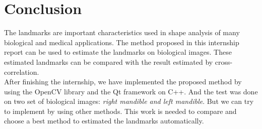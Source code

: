 \chapter*{Conclusion}
\indent The landmarks are important characteristics used in shape analysis of many biological and medical applications. The method proposed in this internship report can be used to estimate the landmarks on biological images. These estimated landmarks can be compared with the result estimated by cross-correlation.\\[0.2cm]
\indent After finishing the internship, we have implemented the proposed method by using the OpenCV library and the Qt framework on C++. And the test was done on two set of biological images: \textit{right mandible and left mandible}. But we can try to implement by using other methods. This work is needed to compare and choose a best method to estimated the landmarks automatically.